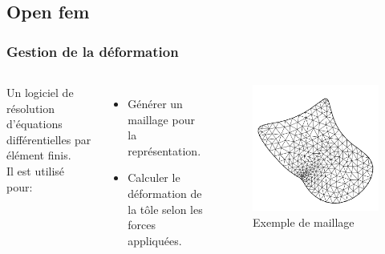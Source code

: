 \documentclass{beamer}
\begin{document}
\subsection{Open fem}
\begin{frame}
    \frametitle{Gestion de la déformation}
    \begin{columns}
        Un logiciel de résolution d'équations différentielles par élément finis.\\
        Il est utilisé pour:
        \begin{itemize}
            \item Générer un maillage pour la représentation.
            \item Calculer le déformation de la tôle selon les forces appliquées.
        \end{itemize}
        \begin{figure}
            \includegraphics[width=\textwidth]{img/maillage.png}
            \caption{Exemple de maillage}
            \label{Maillage}
        \end{figure}
    \end{columns}
\end{frame}
\end{document}
